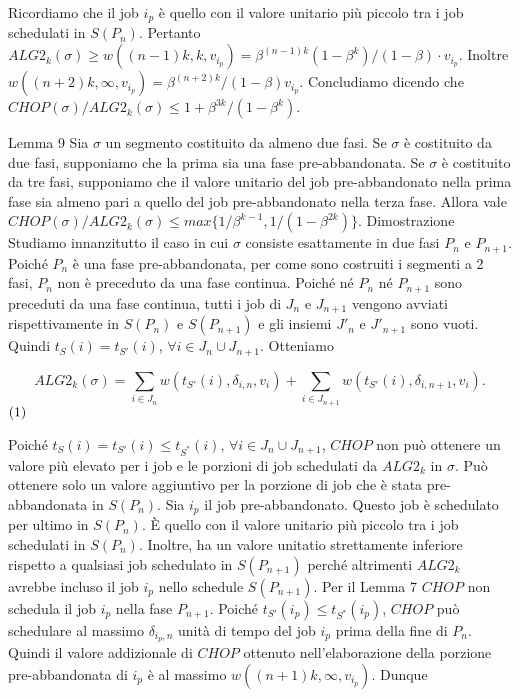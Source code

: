 \documentclass[12pt]{article}
\begin{document}
Ricordiamo che il job $i_{p}$ è quello con il valore unitario più piccolo tra i job schedulati in $S(P_{n})$. Pertanto $ALG2_{k}(\sigma) \geq w((n - 1) k, k, v_{i_{p}}) = \beta^{(n - 1)k} (1 - \beta^{k}) / (1 -\beta) \cdot v_{i_{p}}$. Inoltre $w((n + 2) k, \infty, v_{i_{p}}) = \beta^{(n + 2) k} / (1 - \beta) v_{i_{p}}$. Concludiamo dicendo che $CHOP(\sigma) / ALG2_{k}(\sigma) \leq 1 + \beta^{3k} / (1 - \beta^{k})$.

Lemma 9 Sia $\sigma$ un segmento costituito da almeno due fasi. Se $\sigma$ è costituito da due fasi, supponiamo che la prima sia una fase pre-abbandonata. Se $\sigma$ è costituito da tre fasi, supponiamo che il valore unitario del job pre-abbandonato nella prima fase sia almeno pari a quello del job pre-abbandonato nella terza fase. Allora vale $CHOP(\sigma) / ALG2_{k}(\sigma) \leq max\{1 / \beta^{k - 1}, 1 / (1 - \beta^{2k})\}.$
Dimostrazione
Studiamo innanzitutto il caso in cui $\sigma$ consiste esattamente in due fasi $P_{n}$ e $P_{n+1}$. Poiché $P_{n}$ è una fase pre-abbandonata, per come sono costruiti i segmenti a 2 fasi, $P_{n}$ non è preceduto da una fase continua. Poiché né $P_{n}$ né $P_{n+1}$ sono preceduti da una fase continua, tutti i job di $J_{n}$ e $J_{n+1}$ vengono avviati rispettivamente in $S(P_{n})$ e $S(P_{n+1})$ e gli insiemi $J'_{n}$ e $J'_{n+1}$ sono vuoti. Quindi $t_{S}(i) = t_{S'}(i)$, $\forall i \in J_{n} \cup J_{n+1}$. Otteniamo

$$ALG2_{k} (\sigma) = \sum_{i \in J_{n}} w (t_{S'}(i), \delta_{i,n}, v_{i}) + \sum_{i \in J_{n + 1}} w (t_{S'}(i), \delta_{i, n + 1}, v_{i}).$$ $\hfill (1)$

Poiché $t_{S}(i) = t_{S'}(i) \leq t_{S^{*}}(i)$, $\forall i \in J_{n} \cup J_{n+1}$, $CHOP$ non può ottenere un valore più elevato per i job e le porzioni di job schedulati da $ALG2_{k}$ in $\sigma$. Può ottenere solo un valore aggiuntivo per la porzione di job che è stata pre-abbandonata in $S(P_{n})$. Sia $i_{p}$ il job pre-abbandonato. Questo job è schedulato per ultimo in $S(P_{n})$. È quello con il valore unitario più piccolo tra i job schedulati in $S(P_{n})$. Inoltre, ha un valore unitatio strettamente inferiore rispetto a qualsiasi job schedulato in $S(P_{n+1})$ perché altrimenti $ALG2_{k}$ avrebbe incluso il job $i_{p}$ nello schedule $S(P_{n+1})$. Per il Lemma 7 $CHOP$ non schedula il job $i_{p}$ nella fase $P_{n+1}$. Poiché $t_{S'}(i_{p}) \leq t_{S^{*}}(i_{p})$, $CHOP$ può schedulare al massimo $\delta_{i_{p}, n}$ unità di tempo del job $i_{p}$ prima della fine di $P_{n}$. Quindi il valore addizionale di $CHOP$ ottenuto nell'elaborazione della porzione pre-abbandonata di $i_{p}$ è al massimo $w((n + 1) k, \infty, v_{i_{p}})$. Dunque
\end{document}
